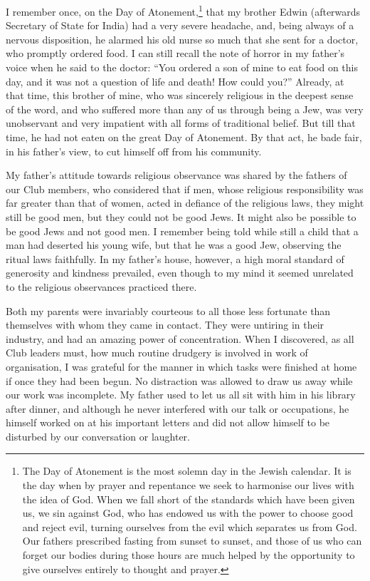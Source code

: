 I remember once, on the Day of Atonement,\footnote{The
Day of Atonement is the most solemn day in the Jewish calendar.
It is the day when by prayer and repentance we seek to harmonise our
lives with the idea of God. When we fall short of the standards which
have been given us, we sin against God, who has endowed us with the
power to choose good and reject evil, turning ourselves from the evil which
separates us from God. Our fathers prescribed fasting from sunset to
sunset, and those of us who can forget our bodies during those hours are
much helped by the opportunity to give ourselves entirely to thought
and prayer.} that my
brother Edwin (afterwards Secretary of State for India)
had a very severe headache, and, being always of a nervous
disposition, he alarmed his old nurse so much that
she sent for a doctor, who promptly ordered food. I can
still recall the note of horror in my father’s voice when he
said to the doctor: “You ordered a son of mine to eat
food on this day, and it was not a question of life and
death! How could you?” Already, at that time, this
brother of mine, who was sincerely religious in the deepest
sense of the word, and who suffered more than any of us
through being a Jew, was very unobservant and very
impatient with all forms of traditional belief. But till
that time, he had not eaten on the great Day of Atonement.
By that act, he bade fair, in his father’s view, to
cut himself off from his community.

My father’s attitude towards religious observance was
shared by the fathers of our Club members, who considered
that if men, whose religious responsibility was far
greater than that of women, acted in defiance of the
religious laws, they might still be good men, but they
could not be good Jews. It might also be possible to be
good Jews and not good men. I remember being told
while still a child that a man had deserted his young wife,
but that he was a good Jew, observing the ritual laws
faithfully. In my father’s house, however, a high moral
standard of generosity and kindness prevailed, even
though to my mind it seemed unrelated to the religious
observances practiced there.

Both my parents were invariably courteous to all those
less fortunate than themselves with whom they came in
contact. They were untiring in their industry, and had
an amazing power of concentration. When I discovered,
as all Club leaders must, how much routine drudgery is
involved in work of organisation, I was grateful for the
manner in which tasks were finished at home if once they
had been begun. No distraction was allowed to draw us
away while our work was incomplete. My father used to
let us all sit with him in his library after dinner, and
although he never interfered with our talk or occupations,
he himself worked on at his important letters and did not
allow himself to be disturbed by our conversation or
laughter.

